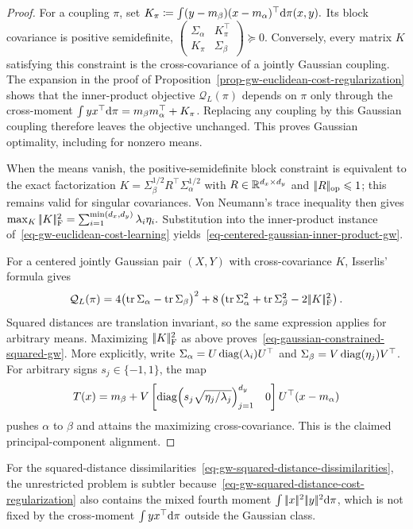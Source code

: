 \begin{proof}
For a coupling $\pi$, set
\(K_\pi \coloneqq \int (y-m_\beta)(x-m_\alpha)^\top\mathrm{d}\pi(x,y).\)
Its block covariance is positive semidefinite,
$\left(\begin{smallmatrix}\Sigma_\alpha&K_\pi^\top\\K_\pi&\Sigma_\beta\end{smallmatrix}\right)\succeq0$.
Conversely, every matrix $K$ satisfying this constraint is the cross-covariance of a jointly Gaussian coupling. The expansion in the proof of Proposition~\ref{prop-gw-euclidean-cost-regularization} shows that the inner-product objective $\mathcal Q_L(\pi)$ depends on $\pi$ only through the cross-moment
$\int yx^\top\mathrm{d}\pi=m_\beta m_\alpha^\top+K_\pi$. Replacing any coupling by this Gaussian coupling therefore leaves the objective unchanged. This proves Gaussian optimality, including for nonzero means.

When the means vanish, the positive-semidefinite block constraint is equivalent to the exact factorization
$K=\Sigma_\beta^{1/2}R^\top\Sigma_\alpha^{1/2}$ with
$R\in\mathbb{R}^{d_x\times d_y}$ and $|\!| R |\!|_{\mathrm{op}}\leqslant1$; this remains valid for singular covariances. Von Neumann's trace inequality then gives \(\max_K|\!| K |\!|_{\mathrm F}^2 = \sum_{i=1}^{\min(d_x,d_y)}\lambda_i\eta_i.\)
Substitution into the inner-product instance of~\eqref{eq-gw-euclidean-cost-learning} yields~\eqref{eq-centered-gaussian-inner-product-gw}.

For a centered jointly Gaussian pair $(X,Y)$ with cross-covariance $K$, Isserlis' formula gives
\[
\mathcal Q_L(\pi)
=
4\bigl(\operatorname{tr}\Sigma_\alpha-\operatorname{tr}\Sigma_\beta\bigr)^2
+8\left(\operatorname{tr}\Sigma_\alpha^2+\operatorname{tr}\Sigma_\beta^2-2|\!| K |\!|_{\mathrm F}^2\right).
\]
Squared distances are translation invariant, so the same expression applies for arbitrary means. Maximizing $|\!| K |\!|_{\mathrm F}^2$ as above proves~\eqref{eq-gaussian-constrained-squared-gw}. More explicitly, write
$\Sigma_\alpha=U\operatorname{diag}(\lambda_i)U^\top$ and
$\Sigma_\beta=V\operatorname{diag}(\eta_j)V^\top$. For arbitrary signs $s_j\in\{-1,1\}$, the map
\[
T(x)
=
m_\beta+V
\begin{bmatrix}
\operatorname{diag}\!\left(s_j\sqrt{\eta_j/\lambda_j}\right)_{j=1}^{d_y}&0
\end{bmatrix}
U^\top(x-m_\alpha)
\]
pushes $\alpha$ to $\beta$ and attains the maximizing cross-covariance. This is the claimed principal-component alignment.
\end{proof}
For the squared-distance dissimilarities~\eqref{eq-gw-squared-distance-dissimilarities}, the unrestricted problem is subtler because~\eqref{eq-gw-squared-distance-cost-regularization} also contains the mixed fourth moment $\int|\!| x |\!|^2|\!| y |\!|^2\mathrm{d}\pi$, which is not fixed by the cross-moment $\int yx^\top\mathrm{d}\pi$ outside the Gaussian class.

